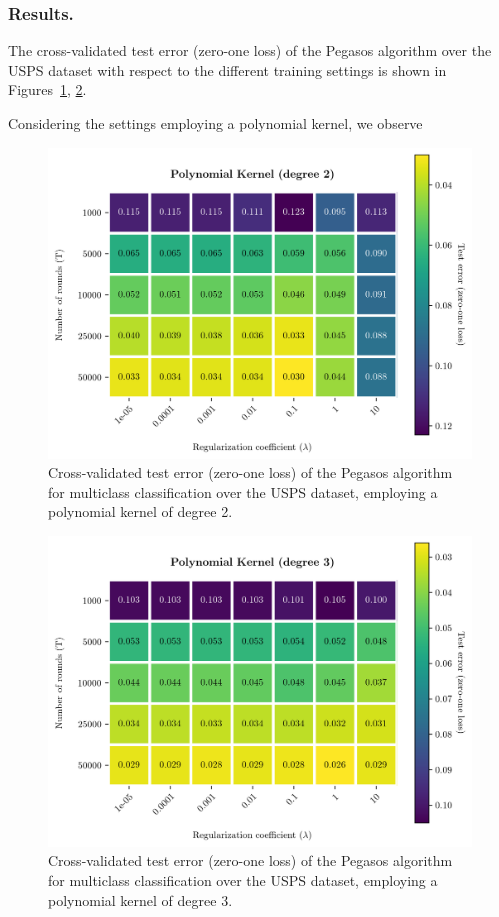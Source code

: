 \documentclass[runningheads]{llncs}
\begin{document}
\subsubsection{Results.} The cross-validated test error (zero-one loss) of the Pegasos algorithm over the USPS dataset with respect to the different training settings is shown in Figures~\ref{fig:experiments:polynomial_2}, \ref{fig:experiments:polynomial_3}.

Considering the settings employing a polynomial kernel, we observe 

\begin{figure}
  \center
  \includegraphics[width=0.8\linewidth]{../img/poly_2_error.png}
  \caption{Cross-validated test error (zero-one loss) of the Pegasos algorithm for multiclass classification over the USPS dataset, employing a polynomial kernel of degree 2.} 
  \label{fig:experiments:polynomial_2}
\end{figure}

\begin{figure}
  \center
  \includegraphics[width=0.8\linewidth]{../img/poly_3_error.png}
  \caption{Cross-validated test error (zero-one loss) of the Pegasos algorithm for multiclass classification over the USPS dataset, employing a polynomial kernel of degree 3.} 
  \label{fig:experiments:polynomial_3}
\end{figure}
\end{document}
